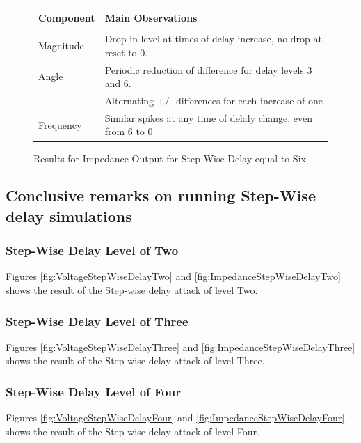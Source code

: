 \begin{figure}[H]
\begin{tabular}{c}
  \end{tabular} 
\caption{Results for Impedance Output for Step-Wise Delay equal to Six}
  \begin{tabular}{p{2cm} p{\textwidth-2cm}}
   & \\
  \textbf{Component} & \textbf{Main Observations} \\
    & \\
      Magnitude  & Drop in level at times of delay increase, no drop at reset to 0. \\
     Angle  &  Periodic reduction of difference for delay levels 3 and 6. \\
                & Alternating +/- differences for each increase of one \\
Frequency &  Similar spikes at any time of delaly change, even from 6 to 0
  \end{tabular}
\label{fig:ImpedanceStepWiseDelaySix}

\end{figure}


\newpage
\subsection{Conclusive remarks on running Step-Wise delay simulations}



\subsubsection{Step-Wise Delay Level of Two}
Figures \ref{fig:VoltageStepWiseDelayTwo} and \ref{fig:ImpedanceStepWiseDelayTwo} shows the result of the Step-wise delay attack of level Two.
\subsubsection{Step-Wise Delay Level of Three}
Figures \ref{fig:VoltageStepWiseDelayThree} and \ref{fig:ImpedanceStepWiseDelayThree} shows the result of the Step-wise delay attack of level Three.

\subsubsection{Step-Wise Delay Level of Four}
Figures \ref{fig:VoltageStepWiseDelayFour} and \ref{fig:ImpedanceStepWiseDelayFour} shows the result of the Step-wise delay attack of level Four.

